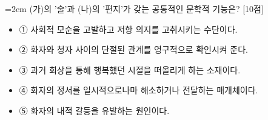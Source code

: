 \documentclass[10pt,a4paper]{article}
\newcommand{\qnum}[1]{%
  \tikz[baseline=(num.base)]{%
    \node[circle, fill=numCircle, text=white, inner sep=0pt,
          minimum size=18pt, font=\small\bfseries] (num) {#1};%
  }%
}
\newcommand{\pts}[1]{%
  \hfill\textcolor{ptsBadge}{[#1점]}%
}
\begin{document}
\vspace{4mm}
\begin{minipage}{\columnwidth}
{\hangindent=2em
\qnum{24}\enspace (가)의 '술'과 (나)의 '편지'가 갖는 공통적인 문학적 기능은? \pts{10}
\par}

\vspace{3mm}
\begin{itemize}[leftmargin=2.5em, labelsep=0.3em, label={}, itemsep=4pt, parsep=1pt, topsep=0pt]
  \item ① 사회적 모순을 고발하고 저항 의지를 고취시키는 수단이다.
  \item ② 화자와 청자 사이의 단절된 관계를 영구적으로 확인시켜 준다.
  \item ③ 과거 회상을 통해 행복했던 시절을 떠올리게 하는 소재이다.
  \item ④ 화자의 정서를 일시적으로나마 해소하거나 전달하는 매개체이다.
  \item ⑤ 화자의 내적 갈등을 유발하는 원인이다.
\end{itemize}
\end{minipage}
\vspace{4mm}
\end{document}
